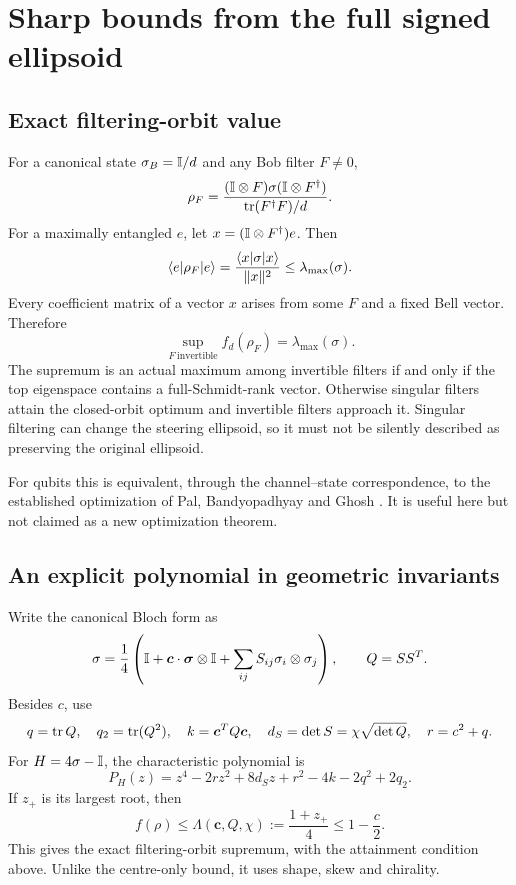 \section{Sharp bounds from the full signed ellipsoid}\label{sec:shape}
\subsection{Exact filtering-orbit value}
For a canonical state $\sigma_B=\mathbb I/d$ and any Bob filter $F\ne0$,
\[
 \rho_F=\frac{(\mathbb I\otimes F)\sigma(\mathbb I\otimes F^\dagger)}{\operatorname{tr}(F^\dagger F)/d}.
\]
For a maximally entangled $e$, let $x=(\mathbb I\otimes F^\dagger)e$. Then
\[
 \langle e\rvert\rho_F\lvert e\rangle=\frac{\langle x\rvert\sigma\lvert x\rangle}{\|x\|^2}\le\lambda_{\max}(\sigma).
\]
Every coefficient matrix of a vector $x$ arises from some $F$ and a fixed Bell vector. Therefore
\begin{equation}\label{eq:orbit}
 \sup_{F\ \mathrm{invertible}}f_d(\rho_F)=\lambda_{\max}(\sigma).
\end{equation}
The supremum is an actual maximum among invertible filters if and only if the top eigenspace contains a full-Schmidt-rank vector. Otherwise singular filters attain the closed-orbit optimum and invertible filters approach it. Singular filtering can change the steering ellipsoid, so it must not be silently described as preserving the original ellipsoid.

For qubits this is equivalent, through the channel--state correspondence, to the established optimization of Pal, Bandyopadhyay and Ghosh \cite{pal}. It is useful here but not claimed as a new optimization theorem.

\subsection{An explicit polynomial in geometric invariants}
Write the canonical Bloch form as
\[
 \sigma=\frac14\left(\mathbb I+\bm c\cdot\bm\sigma\otimes\mathbb I+
 \sum_{ij}S_{ij}\sigma_i\otimes\sigma_j\right),\qquad Q=SS^T.
\]
Besides $c$, use
\[
 q=\operatorname{tr} Q,\quad q_2=\operatorname{tr}(Q^2),\quad k=\bm c^TQ\bm c,\quad
 d_S=\det S=\chi\sqrt{\det Q},\quad r=c^2+q.
\]
For $H=4\sigma-\mathbb I$, the characteristic polynomial is
\begin{equation}\label{eq:quartic}
 \boxed{P_H(z)=z^4-2rz^2+8d_Sz+r^2-4k-2q^2+2q_2.}
\end{equation}
If $z_+$ is its largest root, then
\begin{equation}\label{eq:geometric-bound}
 f(\rho)\le\Lambda(\bm c,Q,\chi):=\frac{1+z_+}{4}\le1-\frac c2.
\end{equation}
This gives the exact filtering-orbit supremum, with the attainment condition above. Unlike the centre-only bound, it uses shape, skew and chirality.

